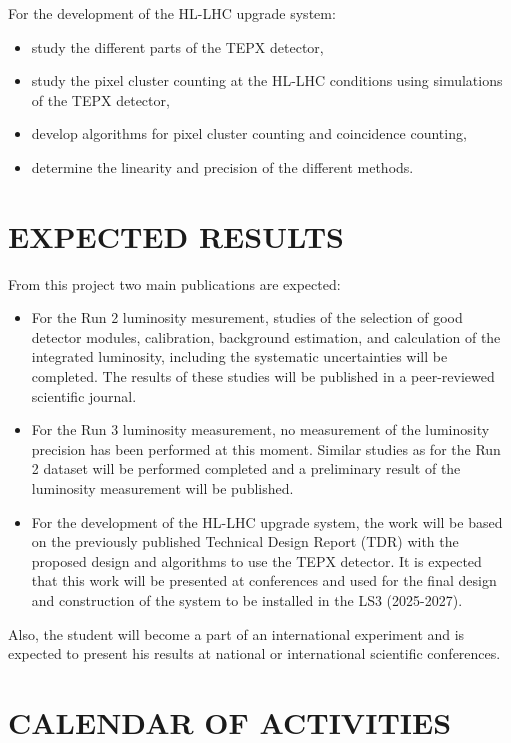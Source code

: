 \documentclass[final,12p]{article}
\begin{document}
\par
For the development of the HL-LHC upgrade system:
\begin{itemize}
\item study the different parts of the TEPX detector,
\item study the pixel cluster counting at the HL-LHC conditions using simulations of the TEPX detector,
\item develop algorithms for pixel  cluster counting and coincidence counting,
\item determine the linearity and  precision of the different methods.
\end{itemize}


\section{EXPECTED RESULTS}

From this project two main publications are expected:
\begin{itemize}
\item For the Run 2 luminosity mesurement, studies of the selection of good detector modules, calibration, background estimation, and calculation of the integrated luminosity, including the systematic uncertainties will be completed.
The results of these studies will be published in a peer-reviewed scientific journal.
\item For the Run 3 luminosity measurement, no measurement of the luminosity precision has been performed at this moment.
Similar studies as for the Run 2 dataset will be performed completed and a preliminary result of the luminosity measurement will be published.
\item For the development of the HL-LHC upgrade system, the work  will be based on the previously published Technical Design Report (TDR) with the proposed design and algorithms to use the TEPX detector.
It is expected that this work will be presented at conferences and used for the final design and construction of the system to be installed in the LS3 (2025-2027).  
\end{itemize}

Also, the student will become a part of an international experiment and is expected to present his results at national or international scientific conferences.



\section{CALENDAR OF ACTIVITIES}
\end{document}
